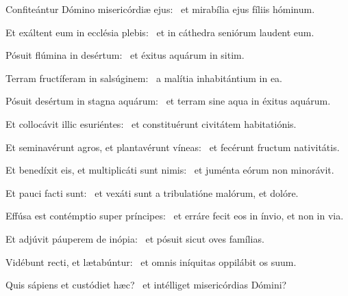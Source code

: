 
\item Confiteántur Dómino misericórdiæ ejus:~\psstar{} et mirabília ejus fíliis hóminum.

\item Et exáltent eum in ecclésia plebis:~\psstar{} et in cáthedra seniórum laudent eum.

\item Pósuit flúmina in desértum:~\psstar{} et éxitus aquárum in sitim.

\item Terram fructíferam in salsúginem:~\psstar{} a malítia inhabitántium in ea.

\item Pósuit desértum in stagna aquárum:~\psstar{} et terram sine aqua in éxitus aquárum.

\item Et collocávit illic esuriéntes:~\psstar{} et constituérunt civitátem habitatiónis.

\item Et seminavérunt agros, et plantavérunt víneas:~\psstar{} et fecérunt fructum nativitátis.

\item Et benedíxit eis, et multiplicáti sunt nimis:~\psstar{} et juménta eórum non minorávit.

\item Et pauci facti sunt:~\psstar{} et vexáti sunt a tribulatióne malórum, et dolóre.

\item Effúsa est contémptio super príncipes:~\psstar{} et erráre fecit eos in ínvio, et non in via.

\item Et adjúvit páuperem de inópia:~\psstar{} et pósuit sicut oves famílias.

\item Vidébunt recti, et lætabúntur:~\psstar{} et omnis iníquitas oppilábit os suum.

\item Quis sápiens et custódiet hæc?~\psstar{} et intélliget misericórdias Dómini?